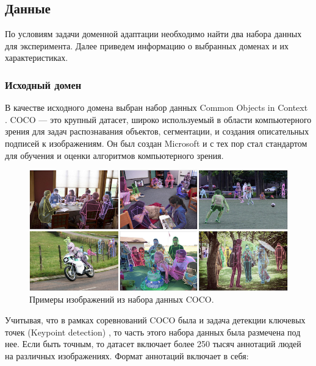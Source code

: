 \subsection{Данные}

По условиям задачи доменной адаптации необходимо найти два набора данных для эксперимента. Далее приведем информацию о выбранных доменах и их характеристиках.

\subsubsection*{Исходный домен}

В качестве исходного домена выбран набор данных Common Objects in Context \cite{COCO_dataset}. COCO — это крупный датасет, широко используемый в области компьютерного зрения для задач распознавания объектов, сегментации, и создания описательных подписей к изображениям. Он был создан Microsoft и с тех пор стал стандартом для обучения и оценки алгоритмов компьютерного зрения.

\begin{figure}[h]
	\centering
	\includegraphics[width=\textwidth]{./images/data_info/coco_dataset}
	\caption{Примеры изображений из набора данных COCO. \cite{COCO_topology}}
	\label{fig:coco_dataset}
\end{figure}

Учитывая, что в рамках соревнований COCO была и задача детекции ключевых точек (Keypoint detection) \cite{COCO_topology}, то часть этого набора данных была размечена под нее. Если быть точным, то датасет включает более 250 тысяч аннотаций людей на различных изображениях. Формат аннотаций включает в себя:

